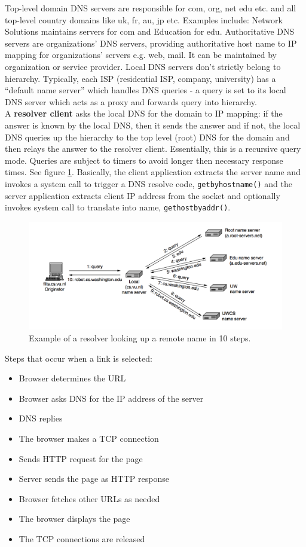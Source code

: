 \documentclass[twoside]{article}
\begin{document}
Top-level domain DNS servers are responsible for com, org, net edu etc. and all
top-level country domains like uk, fr, au, jp etc. Examples include: Network 
Solutions maintains servers for com and Education for edu. Authoritative DNS 
servers are organizations' DNS servers, providing authoritative host name to IP
mapping for organizations' servers e.g. web, mail. It can be maintained by 
organization or service provider. Local DNS servers don't strictly belong to 
hierarchy. Typically, each ISP (residential ISP, company, university) has a 
``default name server'' which handles DNS queries - a query is set to its local
DNS server which acts as a proxy and forwards query into hierarchy. \\

A \textbf{resolver client} asks the local DNS for the domain to IP mapping: if 
the answer is known by the local DNS, then it sends the answer and if not, the 
local DNS queries up the hierarchy to the top level (root) DNS for the domain 
and then relays the answer to the resolver client. Essentially, this is a 
recursive query mode. Queries are subject to timers to avoid longer then 
necessary response times. See figure \ref{fig:query-resolve}. Basically, the 
client application extracts the server name and invokes a system call to trigger
a DNS resolve code, \texttt{getbyhostname()} and the server application extracts
client IP address from the socket and optionally invokes system call to 
translate into name, \texttt{gethostbyaddr()}.
\begin{figure}
  \includegraphics[width=\linewidth]{query-resolve.png}
  \caption{Example of a resolver looking up a remote name in 10 steps.}
  \label{fig:query-resolve}
\end{figure}
Steps that occur when a link is selected:
\begin{itemize}
    \item Browser determines the URL 
    \item Browser asks DNS for the IP address of the server 
    \item DNS replies
    \item The browser makes a TCP connection
    \item Sends HTTP request for the page
    \item Server sends the page as HTTP response
    \item Browser fetches other URLs as needed 
    \item The browser displays the page 
    \item The TCP connections are released
\end{itemize}
\end{document}
